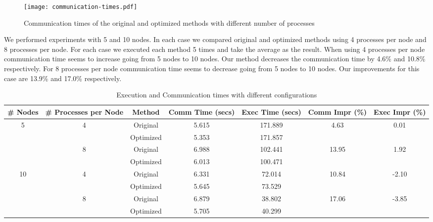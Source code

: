 \documentclass{article}
\begin{document}
\begin{figure}
  \centering
  \texttt{[image: communication-times.pdf]}
  \caption{Communication times of the original and optimized methods with different number of processes}
  \label{fig:time}
\end{figure}

We performed experiments with 5 and 10 nodes.
In each case we compared original and optimized methods using 4 processes per node and 8 processes per node.
For each case we executed each method 5 times and take the average as the result.
When using 4 processes per node communication time seems to increase going from 5 nodes to 10 nodes.
Our method decreases the communication time by 4.6\% and 10.8\% respectively.
For 8 processes per node communication time seems to decrease going from 5 nodes to 10 nodes.
Our improvements for this case are 13.9\% and 17.0\% respectively.

\begin{table}
  \caption{Execution and Communication times with different configurations}
  \label{tab:time}
  \centering
  \begin{tabular}{|c|c|c|c|c|c|c|}
  \hline
  \# Nodes            & \# Processes per Node & Method    & Comm Time (secs) & Exec Time (secs) & Comm Impr (\%)         & Exec Impr (\%)         \\ \hline
  \multirow{4}{*}{5}  & \multirow{2}{*}{4}    & Original  & 5.615            & 171.889          & \multirow{2}{*}{4.63}  & \multirow{2}{*}{0.01}  \\ \cline{3-5}
                      &                       & Optimized & 5.353            & 171.857          &                        &                        \\ \cline{2-7} 
                      & \multirow{2}{*}{8}    & Original  & 6.988            & 102.441          & \multirow{2}{*}{13.95} & \multirow{2}{*}{1.92}  \\ \cline{3-5}
                      &                       & Optimized & 6.013            & 100.471          &                        &                        \\ \hline
  \multirow{4}{*}{10} & \multirow{2}{*}{4}    & Original  & 6.331            & 72.014           & \multirow{2}{*}{10.84} & \multirow{2}{*}{-2.10} \\ \cline{3-5}
                      &                       & Optimized & 5.645            & 73.529           &                        &                        \\ \cline{2-7} 
                      & \multirow{2}{*}{8}    & Original  & 6.879            & 38.802           & \multirow{2}{*}{17.06} & \multirow{2}{*}{-3.85} \\ \cline{3-5}
                      &                       & Optimized & 5.705            & 40.299           &                        &                        \\ \hline
  \end{tabular}
\end{table}
\end{document}
